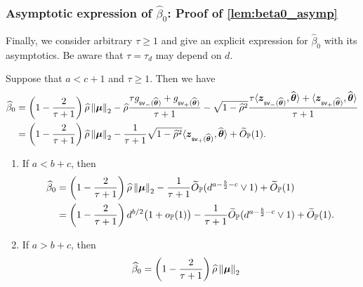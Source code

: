 \subsubsection{Asymptotic expression of $\hat\beta_0$: Proof of \cref{lem:beta0_asymp}}

Finally, we consider arbitrary $\tau \ge 1$ and give an explicit expression for $\hat\beta_0$ with its asymptotics. Be aware that $\tau = \tau_d$ may depend on $d$.
\begin{lem} \label{lem:beta0_asymp}
    Suppose that $a < c + 1$ and $\tau \ge 1$. Then we have
    \begin{equation*}
        \begin{aligned}
            \widehat\beta_0 & = \left(1 - \frac{2}{\tau + 1}\right) \widehat\rho\left\|{{\boldsymbol{\mu}}}\right\|_2 
            - \widehat\rho \frac{\tau g_{\mathsf{sv}_-(\widehat{{\boldsymbol{\theta}}})} + g_{\mathsf{sv}_+(\widehat{{\boldsymbol{\theta}}})} }{\tau + 1}
            - \sqrt{1 - \widehat\rho^2} \frac{ \tau \langle \text{\boldmath $z$}_{\mathsf{sv}_-(\widehat{{\boldsymbol{\theta}}})}, \widehat{{\boldsymbol{\theta}}} \rangle + \langle \text{\boldmath $z$}_{\mathsf{sv}_+(\widehat{{\boldsymbol{\theta}}})}, \widehat{{\boldsymbol{\theta}}} \rangle }{\tau + 1} \\
            & = \left(1 - \frac{2}{\tau + 1}\right) \widehat\rho\left\|{{\boldsymbol{\mu}}}\right\|_2 
            - \frac{1}{\tau + 1} \sqrt{1 - \widehat\rho^2}\langle \text{\boldmath $z$}_{\mathsf{sv}_+(\widehat{{\boldsymbol{\theta}}})}, \widehat{{\boldsymbol{\theta}}} \rangle + \widetilde O_{\mathbb{P}}(1).
        \end{aligned}
    \end{equation*}
    \begin{enumerate}[label=(\alph*)]
        \item \label{lem:beta0_asymp(a)}
        If $a < b + c$, then
        \begin{equation*}
            \begin{aligned}
                \widehat\beta_0 & = \left(1 - \frac{2}{\tau + 1}\right) \widehat\rho\left\|{{\boldsymbol{\mu}}}\right\|_2 
            - \frac{1}{\tau + 1} \widetilde O_{\mathbb{P}}(d^{a-\frac{b}{2}-c} \vee 1) 
            + \widetilde O_{\mathbb{P}}(1) \\
            & = \left(1 - \frac{2}{\tau + 1}\right) d^{b/2}\bigl(1 + o_{\mathbb{P}}(1)\bigr) 
            - \frac{1}{\tau + 1} \widetilde O_{\mathbb{P}}(d^{a-\frac{b}{2}-c} \vee 1)
            + \widetilde O_{\mathbb{P}}(1).
            \end{aligned}
    \end{equation*}
        \item \label{lem:beta0_asymp(b)}
        If $a > b + c$, then
        \begin{equation*}
            \begin{aligned}
            & \hat\beta_0  = \left(1 - \frac{2}{\tau + 1}\right) \hat\rho\norm{\vmu}_2 

\end{aligned}
\end{equation*}
\end{enumerate}
\end{lem}
